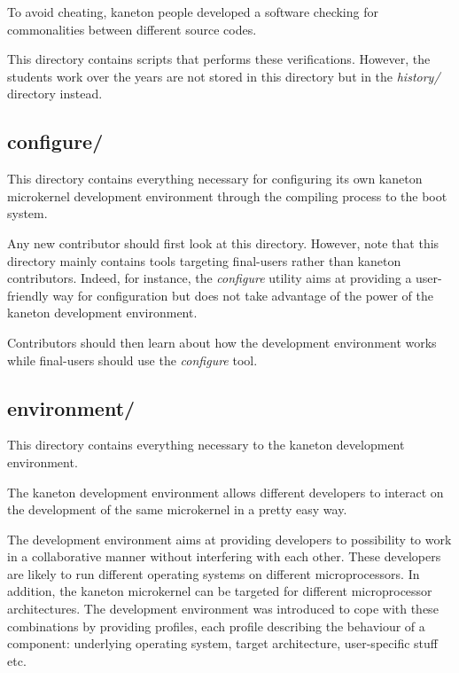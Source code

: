 To avoid cheating, kaneton people developed a software checking for
commonalities between different source codes.

This directory contains scripts that performs these verifications. However,
the students work over the years are not stored in this directory but in
the \textit{history/} directory instead.

%
%

\subsection*{configure/}

This directory contains everything necessary for configuring its own
kaneton microkernel development environment through the compiling process
to the boot system.

Any new contributor should first look at this directory. However, note that
this directory mainly contains tools targeting final-users rather than
kaneton contributors. Indeed, for instance, the \textit{configure} utility
aims at providing a user-friendly way for configuration but does not take
advantage of the power of the kaneton development environment.

Contributors should then learn about how the development environment works
while final-users should use the \textit{configure} tool.

%
%

\subsection*{environment/}

This directory contains everything necessary to the kaneton development
environment.

The kaneton development environment allows different developers to
interact on the development of the same microkernel in a pretty easy way.

The development environment aims at providing developers to possibility to
work in a collaborative manner without interfering with each other. These
developers are likely to run different operating systems on different
microprocessors. In addition, the kaneton microkernel can be targeted for
different microprocessor architectures. The development environment was
introduced to cope with these combinations by providing profiles, each
profile describing the behaviour of a component: underlying operating system,
target architecture, user-specific stuff etc.

